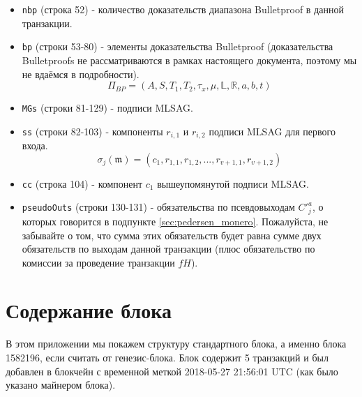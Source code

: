 \begin{appendices}
\begin{itemize}
    \item {\tt nbp} (строка 52) - количество доказательств диапазона Bulletproof в данной транзакции.
    \item {\tt bp} (строки 53-80) - элементы доказательства Bulletproof (доказательства Bulletproofs не рассматриваются в рамках настоящего документа, поэтому мы не вдаёмся в подробно\-сти).\vspace{.175cm}
    \[\Pi_{BP} = (A, S, T_1, T_2, \tau_x, \mu, \mathbb{L}, \mathbb{R}, a, b, t)\]
    \item {\tt MGs} (строки 81-129) - подписи MLSAG.
    \item {\tt ss} (строки 82-103) - компоненты \(r_{i,1}\) и \(r_{i,2}\) подписи MLSAG для первого входа.\vspace{.175cm}
    \[\sigma_j(\mathfrak{m}) = (c_1, r_{1, 1}, r_{1, 2}, ..., r_{v+1, 1}, r_{v+1, 2})\]
    \item {\tt cc} (строка 104) - компонент \(c_1\) вышеупомянутой подписи MLSAG.
    \item {\tt pseudoOuts} (строки 130-131) - обязательства по псевдовыходам $C'^a_j$, о которых говорится в подпункте  \ref{sec:pedersen_monero}. Пожалуйста, не забывайте о том, что сумма этих обязательств будет равна сумме двух обязательств по выходам данной транзакции (плюс обязательство по комиссии за проведение транзакции $f H$).
\end{itemize}




\chapter{Содержание блока}
\label{appendix:block-content}

В этом приложении мы покажем структуру стандартного блока, а именно блока 1582196, если считать от генезис-блока. Блок содержит 5 транзакций и был добавлен в блокчейн с временной меткой 2018-05-27 21:56:01 UTC (как было указано майнером блока).


\end{appendices}
